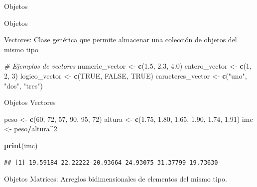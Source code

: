 \documentclass[
  ignorenonframetext,
]{beamer}
\newenvironment{Shaded}{\begin{snugshade}}{\end{snugshade}}
\newcommand{\CommentTok}[1]{\textcolor[rgb]{0.56,0.35,0.01}{\textit{#1}}}
\newcommand{\ConstantTok}[1]{\textcolor[rgb]{0.56,0.35,0.01}{#1}}
\newcommand{\DecValTok}[1]{\textcolor[rgb]{0.00,0.00,0.81}{#1}}
\newcommand{\FloatTok}[1]{\textcolor[rgb]{0.00,0.00,0.81}{#1}}
\newcommand{\FunctionTok}[1]{\textcolor[rgb]{0.13,0.29,0.53}{\textbf{#1}}}
\newcommand{\NormalTok}[1]{#1}
\newcommand{\OtherTok}[1]{\textcolor[rgb]{0.56,0.35,0.01}{#1}}
\newcommand{\SpecialCharTok}[1]{\textcolor[rgb]{0.81,0.36,0.00}{\textbf{#1}}}
\newcommand{\StringTok}[1]{\textcolor[rgb]{0.31,0.60,0.02}{#1}}
\begin{document}
\begin{frame}[fragile]{Objetos}
\begin{block}{Objetos}
\begin{block}{Vectores: Clase genérica que permite almacenar una
colección de objetos del mismo tipo}
\begin{Shaded}
\begin{Highlighting}[]
\CommentTok{\# Ejemplos de vectores}
\NormalTok{numeric\_vector }\OtherTok{\textless{}{-}} \FunctionTok{c}\NormalTok{(}\FloatTok{1.5}\NormalTok{, }\FloatTok{2.3}\NormalTok{, }\FloatTok{4.0}\NormalTok{)}
\NormalTok{entero\_vector }\OtherTok{\textless{}{-}} \FunctionTok{c}\NormalTok{(}\DecValTok{1}\NormalTok{, }\DecValTok{2}\NormalTok{, }\DecValTok{3}\NormalTok{)}
\NormalTok{logico\_vector }\OtherTok{\textless{}{-}} \FunctionTok{c}\NormalTok{(}\ConstantTok{TRUE}\NormalTok{, }\ConstantTok{FALSE}\NormalTok{, }\ConstantTok{TRUE}\NormalTok{)}
\NormalTok{caracteres\_vector }\OtherTok{\textless{}{-}} \FunctionTok{c}\NormalTok{(}\StringTok{"uno"}\NormalTok{, }\StringTok{"dos"}\NormalTok{, }\StringTok{"tres"}\NormalTok{)}
\end{Highlighting}
\end{Shaded}
\end{block}
\end{block}

\begin{block}{Objetos \textbar{} Vectores}
\protect\hypertarget{objetos-vectores}{}
\begin{Shaded}
\begin{Highlighting}[]
\NormalTok{peso }\OtherTok{\textless{}{-}} \FunctionTok{c}\NormalTok{(}\DecValTok{60}\NormalTok{, }\DecValTok{72}\NormalTok{, }\DecValTok{57}\NormalTok{, }\DecValTok{90}\NormalTok{, }\DecValTok{95}\NormalTok{, }\DecValTok{72}\NormalTok{) }
\NormalTok{altura }\OtherTok{\textless{}{-}} \FunctionTok{c}\NormalTok{(}\FloatTok{1.75}\NormalTok{, }\FloatTok{1.80}\NormalTok{, }\FloatTok{1.65}\NormalTok{, }\FloatTok{1.90}\NormalTok{, }\FloatTok{1.74}\NormalTok{, }\FloatTok{1.91}\NormalTok{)}
\NormalTok{imc }\OtherTok{\textless{}{-}}\NormalTok{ peso}\SpecialCharTok{/}\NormalTok{altura}\SpecialCharTok{\^{}}\DecValTok{2}

\FunctionTok{print}\NormalTok{(imc)}
\end{Highlighting}
\end{Shaded}

\begin{verbatim}
## [1] 19.59184 22.22222 20.93664 24.93075 31.37799 19.73630
\end{verbatim}
\end{block}

\begin{block}{Objetos}
\protect\hypertarget{objetos-3}{}
Matrices: Arreglos bidimensionales de elementos del mismo tipo.


\end{block}
\end{frame}
\end{document}
